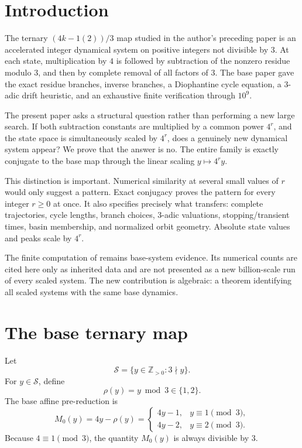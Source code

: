 \documentclass[11pt]{article}
\newcommand{\Sbase}{\mathcal S}
\newcommand{\rhoo}{\rho}
\begin{document}
\section{Introduction}
The ternary $(4k-1(2))/3$ map studied in the author's preceding paper \cite{BanazadehBase} is an accelerated integer dynamical system on positive integers not divisible by $3$. At each state, multiplication by $4$ is followed by subtraction of the nonzero residue modulo $3$, and then by complete removal of all factors of $3$. The base paper gave the exact residue branches, inverse branches, a Diophantine cycle equation, a 3-adic drift heuristic, and an exhaustive finite verification through $10^9$.

The present paper asks a structural question rather than performing a new large search. If both subtraction constants are multiplied by a common power $4^r$, and the state space is simultaneously scaled by $4^r$, does a genuinely new dynamical system appear? We prove that the answer is no. The entire family is exactly conjugate to the base map through the linear scaling $y\mapsto4^r y$.

This distinction is important. Numerical similarity at several small values of $r$ would only suggest a pattern. Exact conjugacy proves the pattern for every integer $r\ge0$ at once. It also specifies precisely what transfers: complete trajectories, cycle lengths, branch choices, 3-adic valuations, stopping/transient times, basin membership, and normalized orbit geometry. Absolute state values and peaks scale by $4^r$.

The finite computation of \cite{BanazadehBase} remains base-system evidence. Its numerical counts are cited here only as inherited data and are not presented as a new billion-scale run of every scaled system. The new contribution is algebraic: a theorem identifying all scaled systems with the same base dynamics.

\section{The base ternary map}
Let
\begin{equation}
\Sbase=\{y\in\mathbb Z_{>0}:3\nmid y\}.
\end{equation}
For $y\in\Sbase$, define
\[
\rhoo(y)=y\bmod3\in\{1,2\}.
\]
The base affine pre-reduction is
\begin{equation}
M_0(y)=4y-\rhoo(y)=
\begin{cases}
4y-1,&y\equiv1\pmod3,\\
4y-2,&y\equiv2\pmod3.
\end{cases}
\label{eq:baseM}
\end{equation}
Because $4\equiv1\pmod3$, the quantity $M_0(y)$ is always divisible by $3$.
\end{document}
